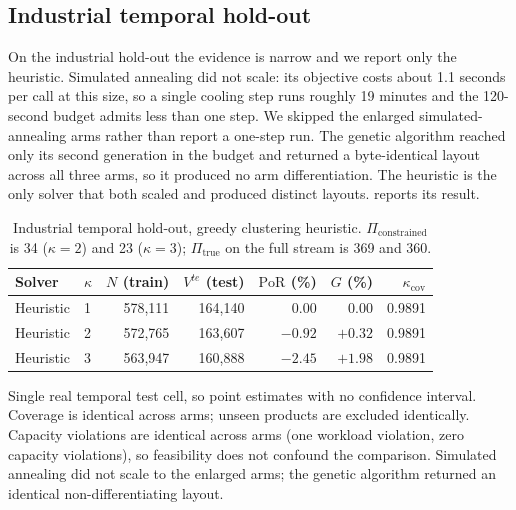 \documentclass[preprint,review,11pt,authoryear]{elsarticle}
\begin{document}
\subsection{Industrial temporal hold-out}\label{sec:rc-berner-res}

On the industrial hold-out the evidence is narrow and we report only the heuristic. Simulated annealing did not scale: its objective costs about 1.1 seconds per call at this size, so a single cooling step runs roughly 19 minutes and the 120-second budget admits less than one step. We skipped the enlarged simulated-annealing arms rather than report a one-step run. The genetic algorithm reached only its second generation in the budget and returned a byte-identical layout across all three arms, so it produced no arm differentiation. The heuristic is the only solver that both scaled and produced distinct layouts.  reports its result.

\begin{table}[t]
  \centering
  \small
  \begin{threeparttable}
  \begin{tabular}{@{}llrrrrr@{}}
    \toprule
    Solver & $\kappa$ & $N$ (train) & $V^{te}$ (test) & $\mathrm{PoR}$ (\%) & $G$ (\%) & $\kappa_{\text{cov}}$ \\
    \midrule
    Heuristic & 1 & 578{,}111 & 164{,}140 & 0.00 & 0.00 & 0.9891 \\
    Heuristic & 2 & 572{,}765 & 163{,}607 & $-0.92$ & $+0.32$ & 0.9891 \\
    Heuristic & 3 & 563{,}947 & 160{,}888 & $-2.45$ & $+1.98$ & 0.9891 \\
    \bottomrule
  \end{tabular}
  \begin{tablenotes}\footnotesize
    \item Single real temporal test cell, so point estimates with no confidence interval. Coverage is identical across arms; unseen products are excluded identically. Capacity violations are identical across arms (one workload violation, zero capacity violations), so feasibility does not confound the comparison. Simulated annealing did not scale to the enlarged arms; the genetic algorithm returned an identical non-differentiating layout.
  \end{tablenotes}
  \end{threeparttable}
  \caption{Industrial temporal hold-out, greedy clustering heuristic. $\Pi_{\text{constrained}}$ is 34 ($\kappa=2$) and 23 ($\kappa=3$); $\Pi_{\text{true}}$ on the full stream is 369 and 360.}
  \label{tab:rc-berner}
\end{table}
\end{document}
